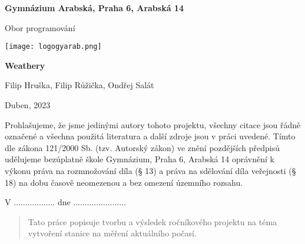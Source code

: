 \begin{titlepage}
\begin{center}
\large \vspace*{\fill}
\thispagestyle{empty}

\LARGE

{ \huge \textbf{Gymnázium Arabská, Praha 6, Arabská 14}}

{\LARGE Obor programování }

\vfill
\texttt{[image: logogyarab.png]}
\vspace{15pt}

\vfill

{\huge \textbf{Weathery}}

\vfill

Filip Hruška, Filip Růžička, Ondřej Salát

\vfill

{\large Duben, 2023}

\vspace*{\fill}
\end{center}
\end{titlepage}

\thispagestyle{empty}
\addtocounter{page}{-1}
\vspace*{\fill}
Prohlašujeme, že jsme jedinými autory tohoto projektu, všechny citace jsou řádně označené a všechna 
použitá literatura a další zdroje jsou v práci uvedené. Tímto dle zákona 121/2000 Sb. (tzv. Autorský zákon) 
ve znění pozdějších předpisů udělujeme bezúplatně škole Gymnázium, Praha 6, Arabská 14 oprávnění k výkonu 
práva na rozmnožování díla (§ 13) a práva na sdělování díla veřejnosti (§ 18) na dobu časově neomezenou a 
bez omezení územního rozsahu.

\vspace{2cm}
V .................. dne .......................


\vspace{2cm}


\vspace{2cm}



\newpage
\begin{abstract}
	Tato práce popisuje tvorbu a výsledek ročníkového projektu na téma vytvoření stanice na měření aktuálního počasí.
\end{abstract}


\tableofcontents

